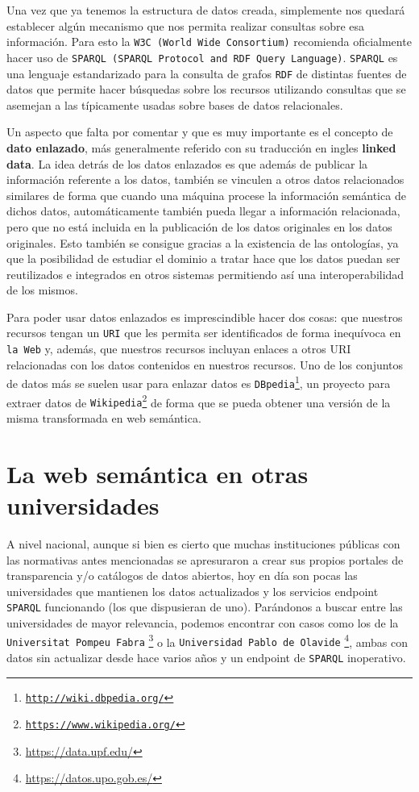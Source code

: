 \bigskip
Una vez que ya tenemos la estructura de datos creada, simplemente nos quedará establecer algún mecanismo que nos permita realizar consultas sobre esa información. Para esto la {\tt W3C (World Wide Consortium)} recomienda oficialmente hacer uso de {\tt SPARQL (SPARQL Protocol and RDF Query Language)}. {\tt SPARQL} es una lenguaje estandarizado para la consulta de grafos {\tt RDF} de distintas fuentes de datos que permite hacer búsquedas sobre los recursos utilizando consultas que se asemejan a las típicamente usadas sobre bases de datos relacionales.

\bigskip

Un aspecto que falta por comentar y que es muy importante es el concepto de \textbf{dato enlazado}, más generalmente referido con su traducción en ingles \textbf{linked data}. La idea detrás de los datos enlazados es que además de publicar la información referente a los datos, también se vinculen a otros datos relacionados similares de forma que cuando una máquina procese la información semántica de dichos datos, automáticamente también pueda llegar a información relacionada, pero que no está incluida en la publicación de los datos originales en los datos originales. Esto también se consigue gracias a la existencia de las ontologías, ya que la posibilidad de estudiar el dominio a tratar hace que los datos puedan ser reutilizados e integrados en otros sistemas permitiendo así una interoperabilidad de los mismos.

\bigskip
Para poder usar datos enlazados es imprescindible hacer dos cosas: que nuestros recursos tengan un {\tt URI} que les permita ser identificados de forma inequívoca en {\tt la Web} y, además, que nuestros recursos incluyan enlaces a otros {URI} relacionadas con los datos contenidos en nuestros recursos. Uno de los conjuntos de datos más se suelen usar para enlazar datos es {\tt DBpedia\footnote{\url{http://wiki.dbpedia.org/}}}, un proyecto para extraer datos de {\tt Wikipedia\footnote{\url{https://www.wikipedia.org/}}} de forma que se pueda obtener una versión de la misma transformada en web semántica.

\newpage
\section{La web semántica en otras universidades}

A nivel nacional, aunque si bien es cierto que muchas instituciones públicas con las normativas antes mencionadas se apresuraron a crear sus propios portales de transparencia y/o catálogos de datos abiertos, hoy en día son pocas las universidades que mantienen los datos actualizados y los servicios endpoint {\tt SPARQL} funcionando (los que dispusieran de uno). Parándonos a buscar entre las universidades de mayor relevancia, podemos encontrar con casos como los de la {\tt Universitat Pompeu Fabra} \footnote{\url{https://data.upf.edu/}} o la {\tt Universidad Pablo de Olavide} \footnote{\url{https://datos.upo.gob.es/}}, ambas con datos sin actualizar desde hace varios años y un endpoint de {\tt SPARQL} inoperativo.

